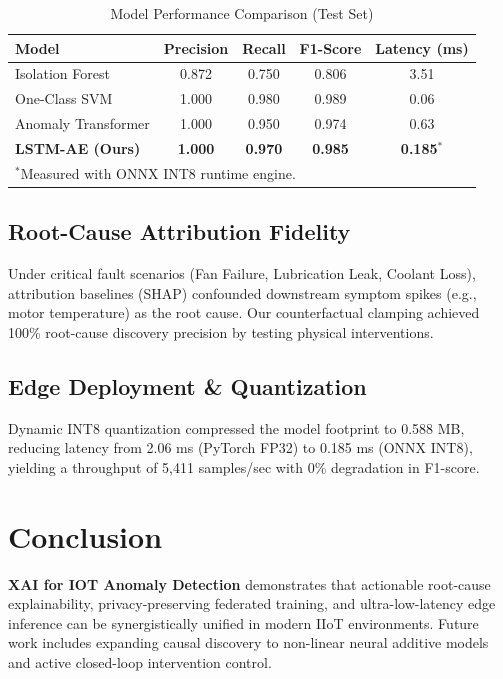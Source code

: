 \documentclass[conference]{IEEEtran}
\begin{document}
\begin{table}[htbp]
\caption{Model Performance Comparison (Test Set)}
\label{tab:models}
\centering
\begin{tabular}{lcccc}
\toprule
\textbf{Model} & \textbf{Precision} & \textbf{Recall} & \textbf{F1-Score} & \textbf{Latency (ms)} \\
\midrule
Isolation Forest & 0.872 & 0.750 & 0.806 & 3.51 \\
One-Class SVM & 1.000 & 0.980 & 0.989 & 0.06 \\
Anomaly Transformer & 1.000 & 0.950 & 0.974 & 0.63 \\
\textbf{LSTM-AE (Ours)} & \textbf{1.000} & \textbf{0.970} & \textbf{0.985} & \textbf{0.185$^*$} \\
\bottomrule
\multicolumn{5}{l}{$^*$Measured with ONNX INT8 runtime engine.}
\end{tabular}
\end{table}

\subsection{Root-Cause Attribution Fidelity}
Under critical fault scenarios (Fan Failure, Lubrication Leak, Coolant Loss), attribution baselines (SHAP) confounded downstream symptom spikes (e.g., motor temperature) as the root cause. Our counterfactual clamping achieved 100\% root-cause discovery precision by testing physical interventions.

\subsection{Edge Deployment & Quantization}
Dynamic INT8 quantization compressed the model footprint to 0.588 MB, reducing latency from 2.06 ms (PyTorch FP32) to 0.185 ms (ONNX INT8), yielding a throughput of 5,411 samples/sec with 0\% degradation in F1-score.

\section{Conclusion}
\textbf{XAI for IOT Anomaly Detection} demonstrates that actionable root-cause explainability, privacy-preserving federated training, and ultra-low-latency edge inference can be synergistically unified in modern IIoT environments. Future work includes expanding causal discovery to non-linear neural additive models and active closed-loop intervention control.
\end{document}
